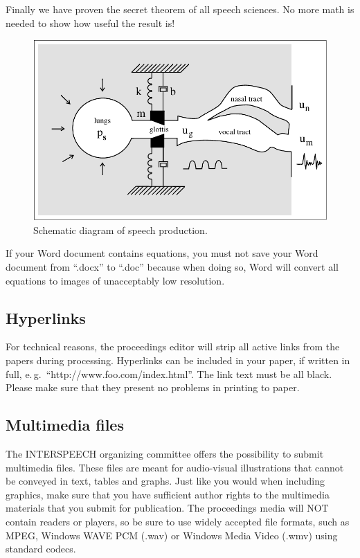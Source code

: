 \documentclass[a4paper]{article}
\begin{document}
Finally we have proven the secret theorem of all speech sciences. No more math is needed to show how useful the result is!

\begin{figure}[t]
  \centering
  \includegraphics[width=\linewidth]{figure.pdf}
  \caption{Schematic diagram of speech production.}
  \label{fig:speech_production}
\end{figure}


If your Word document contains equations, you must not save your Word document from ``.docx'' to ``.doc'' because when doing so, Word will convert all equations to images of unacceptably low resolution.

\subsection{Hyperlinks}

For technical reasons, the proceedings editor will strip all active links from the papers during processing. Hyperlinks can be included in your paper, if written in full, e.\,g.\ ``http://www.foo.com/index.html''. The link text must be all black. 
Please make sure that they present no problems in printing to paper.

\subsection{Multimedia files}

The INTERSPEECH organizing committee offers the possibility to submit multimedia files. These files are meant for audio-visual illustrations that cannot be conveyed in text, tables and graphs. Just like you would when including graphics, make sure that you have sufficient author rights to the multimedia materials that you submit for publication. The proceedings media will NOT contain readers or players, so be sure to use widely accepted file formats, such as MPEG, Windows WAVE PCM (.wav) or Windows Media Video (.wmv) using standard codecs.
\end{document}
